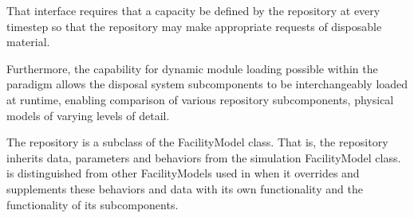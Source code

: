 That interface requires that a capacity be defined by the repository at every 
\Cyclus timestep so that the repository may make appropriate requests of 
disposable material.

Furthermore, the capability for dynamic module loading possible within 
the \Cyclus paradigm allows the disposal system subcomponents to be 
interchangeably loaded at runtime, enabling comparison of various 
repository subcomponents, physical models of varying levels of detail. 

The \Cyder repository is a subclass of the FacilityModel class.  That is, the 
repository inherits data, parameters and behaviors from the \Cyclus simulation 
FacilityModel class. \Cyder is distinguished from other FacilityModels used in 
\Cyclus when it overrides and supplements these behaviors and data with its own 
functionality and the functionality of its subcomponents.





